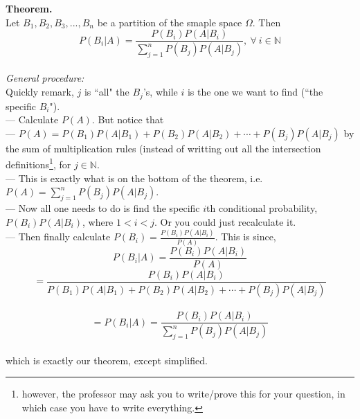 \documentclass[12pt]{book}
\begin{document}
\noindent\textbf{Theorem. }\\
Let $B_{1},B_{2},B_{3},...,B_{n}$ be a partition of the smaple space $\Omega$. 
Then $$\boxed{P(B_{i}|A)=\dfrac{P(B_{i})P(A|B_{i})}{\sum\limits_{j=1}^{n}P(B_{j})P(A|B_{j})},~\forall~i\in\mathbb{N}}$$\\
\textit{General procedure: }\\
Quickly remark, $j$ is ``all" the $B_j$'s, while $i$ is the one we want to find (``the specific $B_i$").\\
--- Calculate $P(A)$. But notice that\\
--- $P(A)=P(B_1)P(A|B_1)+P(B_2)P(A|B_2)+\cdots+P(B_j)P(A|B_j)$ by the sum of multiplication rules (instead of writting out all the intersection definitions\footnote{however, the professor may ask you to write/prove this for your question, in which case you have to write everything.}, for $j\in\mathbb{N}$.\\
--- This is exactly what is on the bottom of the theorem, i.e. $P(A)=\sum\limits_{j=1}^{n} P(B_{j})P(A|B_{j})$.\\
--- Now all one needs to do is find the specific $i$th conditional probability, $P(B_{i})P(A|B_{i})$, where $1<i<j$. Or you could just recalculate it. \\
--- Then finally calculate $\boxed{P(B_i)=\frac{P(B_i)P(A|B_i)}{P(A)}}$. This is since,  \newpage
$$\boxed{P(B_i|A)=\frac{P(B_{i})P(A|B_{i})}{P(A)}}$$
$$=\frac{P(B_{i})P(A|B_{i})}{P(B_1)P(A|B_1)+P(B_2)P(A|B_2)+\cdots+P(B_j)P(A|B_j)}$$\\
$$=P(B_{i}|A)=\dfrac{P(B_{i})P(A|B_{i})}{\sum\limits_{j=1}^{n}P(B_{j})P(A|B_{j})}$$\\
which is exactly our theorem, except simplified.



\end{document}
